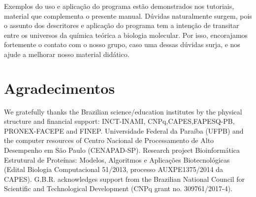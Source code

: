 \documentclass[a4paper,11pt]{refart}
\begin{document}
Exemplos do uso e aplicação do programa estão demonstrados nos tutoriais, material que complementa o presente manual. Dúvidas naturalmente surgem, pois o assunto dos descritores e aplicação do programa tem a intenção de transitar entre os universos da química teórica a biologia molecular. Por isso, encorajamos fortemente o contato com o nosso grupo, caso uma dessas dúvidas surja, e nos ajude a melhorar nosso material didático. 

\newpage
\section*{Agradecimentos}

We gratefully thanks the Brazilian science/education institutes by the physical structure and financial support: INCT-INAMI, CNPq,CAPES,FAPESQ-PB, PRONEX-FACEPE and FINEP. Universidade Federal da Paraíba (UFPB) and the computer resources of Centro Nacional de Processamento de Alto Desempenho em São Paulo (CENAPAD-SP). 		
Research project Bioinformática Estrutural de Proteínas: Modelos, Algoritmos e Aplicações Biotecnológicas (Edital Biologia Computacional 51/2013, processo AUXPE1375/2014 da CAPES). G.B.R. acknowledges support from the Brazilian National Council for Scientific and Technological Development (CNPq grant no. 309761/2017-4).


\newpage

\end{document}
